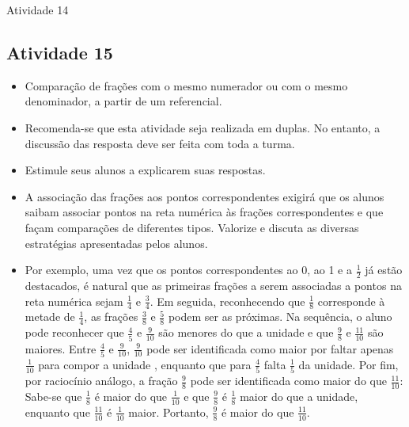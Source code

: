 \begin{multicols}{2}
\begin{resposta*}{Atividade 14}
\end{resposta*}


\subsection{Atividade 15}
  
\begin{itemize} %
    \item       Comparação de frações com o mesmo numerador ou com o mesmo denominador, a partir de um referencial.
\end{itemize} %
  
  
\begin{itemize}
    \item       Recomenda-se que esta atividade seja realizada em duplas. No entanto, a discussão das resposta deve ser feita com toda a turma.
    \item       Estimule seus alunos a explicarem suas respostas.
    \item       A associação das frações aos pontos correspondentes exigirá que os alunos saibam associar pontos na reta numérica às frações correspondentes e que façam comparações de diferentes tipos. Valorize e discuta as diversas estratégias apresentadas pelos alunos. 
    \item       Por exemplo, uma vez que os pontos correspondentes ao 0, ao 1 e a       $\frac{1}{2}$       já estão destacados, é natural que as primeiras frações a serem associadas a pontos na reta numérica sejam       $\frac{1}{4}$       e       $\frac{3}{4}$. Em seguida, reconhecendo que       $\frac{1}{8}$       corresponde à metade de       $\frac{1}{4}$,  as frações       $\frac{3}{8}$       e       $\frac{5}{8}$       podem ser as próximas.  Na sequência, o aluno pode reconhecer que       $\frac{4}{5}$       e       $\frac{9}{10}$       são menores do que a unidade e que       $\frac{9}{8}$       e       $\frac{11}{10}$       são maiores.  Entre       $\frac{4}{5}$       e       $\frac{9}{10}$,       $\frac{9}{10}$       pode ser identificada como maior por faltar  apenas       $\frac{1}{10}$       para compor a unidade , enquanto que para       $\frac{4}{5}$       falta       $\frac{1}{5}$       da unidade. Por fim, por raciocínio análogo, a fração       $\frac{9}{8}$       pode ser identificada como maior do que       $\frac{11}{10}$: Sabe-se que $\frac{1}{8}$ é maior do que $\frac{1}{10}$ e que $\frac{9}{8}$  é  $\frac{1}{8}$       maior do que a unidade, enquanto que       $\frac{11}{10}$       é        $\frac{1}{10}$       maior. Portanto, $\frac{9}{8}$    é maior do que       $\frac{11}{10}$.

\end{itemize}
\end{multicols}
